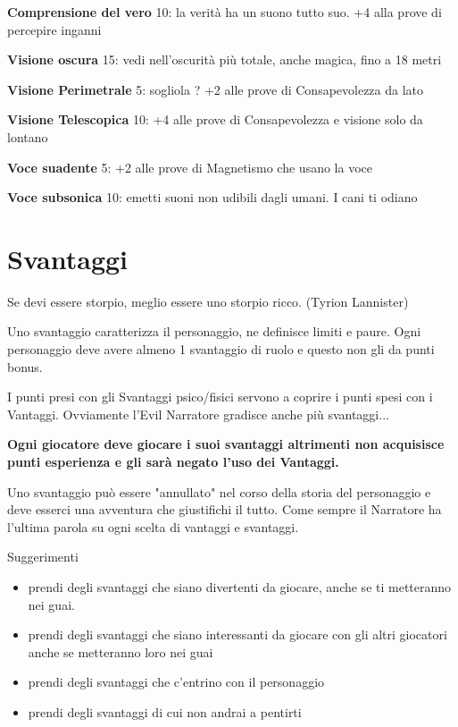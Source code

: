 \documentclass[a4paper,11pt,twoside,openany]{book}
\begin{document}
\textbf{Comprensione del vero} 10: la verità ha un suono tutto suo. +4 alla prove di percepire inganni

\textbf{Visione oscura} 15: vedi nell'oscurità più totale, anche magica, fino a 18 metri

\textbf{Visione Perimetrale} 5: sogliola ? +2 alle prove di Consapevolezza da lato

\textbf{Visione Telescopica} 10: +4 alle prove di Consapevolezza e visione solo da lontano

\textbf{Voce suadente} 5: +2 alle prove di Magnetismo che usano la voce

\textbf{Voce subsonica} 10: emetti suoni non udibili dagli umani. I cani ti odiano

\pagebreak

\section{Svantaggi}

\label{svantaggi}
\begin{tcolorbox}[enhanced,arc=5pt,boxrule=0.3pt]{Se devi essere storpio, meglio essere uno storpio ricco. (Tyrion Lannister)}\end{tcolorbox}\medskip

Uno svantaggio caratterizza il personaggio, ne definisce limiti e paure. Ogni personaggio deve avere almeno 1 svantaggio di ruolo e questo non gli da punti bonus.

I punti presi con gli Svantaggi psico/fisici servono a coprire i punti spesi con i Vantaggi. Ovviamente l'Evil Narratore gradisce anche più svantaggi...

\textbf{Ogni giocatore deve giocare i suoi svantaggi altrimenti non acquisisce punti esperienza e gli sarà negato l'uso dei Vantaggi.}

Uno svantaggio può essere "annullato" nel corso della storia del personaggio e deve esserci una avventura che giustifichi il tutto. Come sempre il Narratore ha l'ultima parola su ogni scelta di vantaggi e svantaggi.

\bigskip

Suggerimenti
\begin{itemize}
	\item
	      prendi degli svantaggi che siano divertenti da giocare, anche se ti metteranno nei guai.
	\item
	      prendi degli svantaggi che siano interessanti da giocare con gli altri giocatori anche se metteranno loro nei guai
	\item
	      prendi degli svantaggi che c'entrino con il personaggio
	\item
	      prendi degli svantaggi di cui non andrai a pentirti
\end{itemize}
\end{document}
